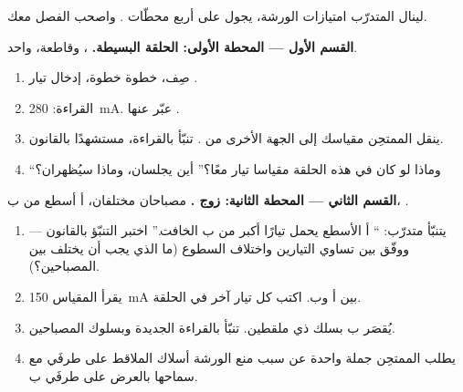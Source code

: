 \begin{problem}\label{pb:g8:intensity-ammeter:1}
لينال المتدرّب امتيازات الورشة، يجول على أربع محطّات .
واصحب الفصل معك.

\medskip\noindent\textbf{القسم الأول --- المحطة الأولى: الحلقة
البسيطة.}
، وقاطعة،  واحد.
\begin{enumerate}
  \item صِف، خطوة خطوة، إدخال   تيار
        .
  \item القراءة: \qty{280}{mA}. عبّر عنها .
  \item ينقل الممتحِن مقياسك إلى الجهة الأخرى من .
        تنبّأ بالقراءة، مستشهدًا بالقانون.
  \item ``وماذا لو كان في هذه الحلقة مقياسا تيار معًا؟'' أين
        يجلسان، وماذا سيُظهران؟
\end{enumerate}

\medskip\noindent\textbf{القسم الثاني --- المحطة الثانية: زوج
.}
مصباحان مختلفان،  أ أسطع من ب، .
\begin{enumerate}[resume]
  \item يتنبّأ متدرّب: `` أ الأسطع يحمل تيارًا أكبر من ب
        الخافت.'' اختبر التنبّؤ بالقانون --- ووفّق بين تساوي
        التيارين واختلاف السطوع (ما الذي يجب أن يختلف بين
        المصباحين؟).
  \item يقرأ المقياس \qty{150}{mA} بين أ وب. اكتب كل تيار آخر
        في الحلقة.
  \item يُقصَر  ب بسلك ذي ملقطين. تنبّأ بالقراءة
        الجديدة وبسلوك المصباحين.
  \item يطلب الممتحِن جملة واحدة عن سبب منع الورشة أسلاك
        الملاقط على طرفَي \emph{} مع سماحها بالعرض على
        طرفَي ب.
\end{enumerate}


\end{problem}
